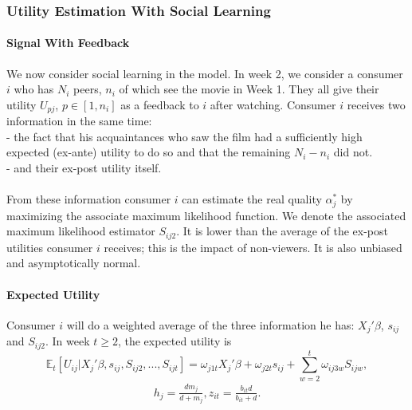 \documentclass{article}
\begin{document}
\subsubsection{Utility Estimation With Social Learning}	

\paragraph{Signal With Feedback}
We now consider social learning in the model. In week 2, we consider a consumer $i$ who has $N_{i}$ peers, $n_{i}$ of which see the movie in Week 1. They all give their utility $U_{p j }$, $p\in[1,n_{i}]$ as a feedback to $i$ after watching. Consumer $i$ receives two information in the same time:\\
- the fact that his acquaintances who saw the film had a sufficiently high expected (ex-ante) utility to do so and that the remaining $N_{i}-n_{i}$ did not.\\
- and their ex-post utility itself.\\\\
From these information consumer $i$ can estimate the real quality $\alpha_{j}^{*}$ by maximizing the associate maximum likelihood function. We denote the associated maximum likelihood estimator $S_{i j 2}$. It is lower than the average of the ex-post utilities consumer $i$ receives; this is the impact of non-viewers. It is also unbiased and asymptotically normal.

\paragraph{Expected Utility}
Consumer $i$ will do a weighted average of the three information he has: $X_{j}'\beta$, $s_{i j}$ and $S_{i j 2}$.
In week $t\geqslant2$, the expected utility is
\begin{equation}
\mathbb{E}_t[U_{i j}|X_{j}'\beta, s_{i j}, S_{i j 2}, ..., S_{i j t}]=\omega_{j 1 t}X_{j}'\beta +\omega_{j 2 t}s_{i j}+\sum_{w=2}^{t}\omega_{i j 3 w}S_{i j w}, 
\end{equation}
\begin{align*}
h_{j}=\frac{d m_{j}}{d+m_{j}}, z_{i t}=\frac{b_{i t}d}{b_{i t}+d}.
\end{align*}
\end{document}
